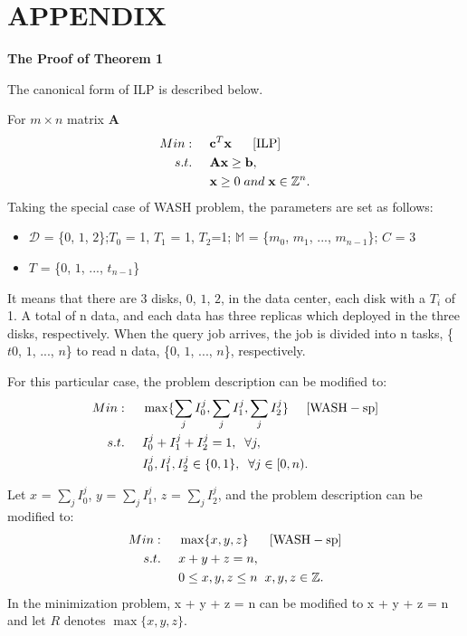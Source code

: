 \documentclass[conference]{IEEEtran}
\begin{document}
\section*{APPENDIX}

\textbf{\normalsize{The Proof of Theorem 1}}
\vspace{1ex}

The canonical form \cite{b11} of ILP is described below.

For $m\times n$ matrix \textbf{A}
\begin{align}
Min:&\;\;\;\;\;\textbf{c}^T\textbf{x}\;\;\;\;\;\;[\rm{ILP}]\label{ILP}\\
s.t. 
&\;\;\;\;\;\textbf{A}\textbf{x}\geq \textbf{b},\nonumber\\
&\;\;\;\;\;\textbf{x} \geq0\;and\;\textbf{x} \in \mathbb{Z}^n.\nonumber
\end{align}
Taking the special case of WASH problem, the parameters are set as follows:
\begin{itemize}
	\item $\mathcal{D}$ = \{$0$, $1$, $2$\};$T_0$ = 1, $T_1$ = 1, $T_2$=1; $\mathbb{M}$ = \{$m_0$, $m_1$, ..., $m_{n-1}$\}; $C$ = 3
	\item $T$ = \{$0$, $1$, ..., $t_{n-1}$\}
\end{itemize}

It means that there are 3 disks, $0$, $1$, $2$, in the data center, each disk with a $T_i$ of 1. A total of n data, and each data has three replicas which deployed in the three disks, respectively. When the query job arrives, the job is divided into n tasks, \{$t0$, $1$, ..., $n$\} to read n data, \{$0$, $1$, ..., $n$\}, respectively.

For this particular case, the problem description can be modified to:
\begin{align}
Min:&\;\;\;\;\;\max\{\sum_{j}I_0^j, \sum_{j}I_1^j, \sum_{j}I_2^j\}\;\;\;\;\;[\rm{WASH-sp}]\\
s.t. 
&\;\;\;\;\;I_0^j + I_1^j +I_2^j= 1,\;\;\forall j,\nonumber\\
&\;\;\;\;\;I_0^j, I_1^j, I_2^j\in\{0,1\},\;\;\forall j \in[0,n).\nonumber
\end{align}

Let  $x$ = $\sum_{j}I_0^j$, $y$ = $\sum_{j}I_1^j$, $z$ = $\sum_{j}I_2^j$, and the problem description can be modified to:
\begin{align}
Min:&\;\;\;\;\;\max\{x,y,z\}\;\;\;\;\;\;[\rm{WASH-sp}]\\
s.t. 
&\;\;\;\;\;x + y + z = n,\;\label{enlarge-cons}\\
&\;\;\;\;\;0 \leq x, y, z \leq n  \;\;x, y, z\in\mathbb{Z}.\nonumber
\end{align}
In the minimization problem, x + y + z = n can be modified to x + y + z = n and let $R$ denotes $\max\{x,y,z\}$. 
\end{document}
